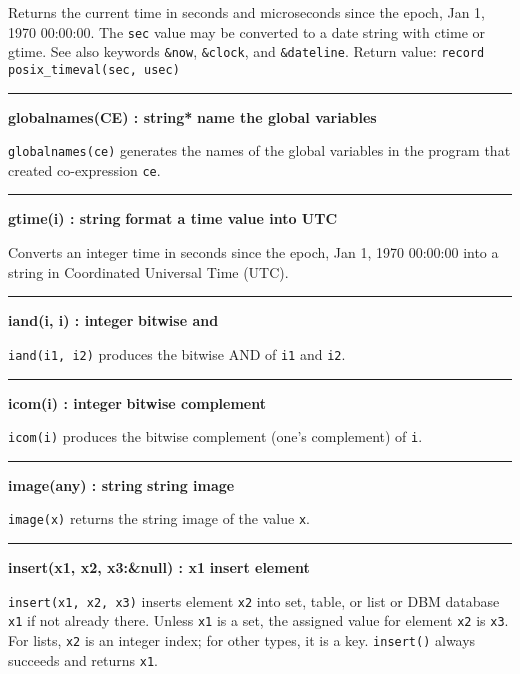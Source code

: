 \noindent
{}Returns the current time in seconds and microseconds
since the epoch, Jan 1, 1970 00:00:00. The \texttt{sec} value may be
converted to a date string with ctime or gtime. See also keywords
\texttt{\&now}, \texttt{\&clock}, and \texttt{\&dateline}. Return
value: \texttt{record posix\_timeval(sec, usec)} 

\bigskip\hrule\vspace{0.1cm}
\noindent
{\bf globalnames(CE) : string* } \hfill {\bf name the global variables}

\noindent
{}\texttt{globalnames(ce)} generates the names of the global
variables in the program that created co-expression \texttt{ce}.

\bigskip\hrule\vspace{0.1cm}
\noindent
{\bf gtime(i) : string } \hfill {\bf format a time value into UTC }

\noindent
Converts an integer time in seconds since the epoch, Jan 1, 1970
00:00:00 into a string in Coordinated Universal Time (UTC). 

\bigskip\hrule\vspace{0.1cm}
\noindent
{\bf iand(i, i) : integer } \hfill {\bf bitwise and}

\noindent
{}\texttt{iand(i1, i2)} produces the bitwise AND of
\texttt{i1} and \texttt{i2}.

\bigskip\hrule\vspace{0.1cm}
\noindent
{\bf icom(i) : integer } \hfill {\bf bitwise complement}

\noindent
\texttt{icom(i)} produces the bitwise complement (one's
complement) of \texttt{i}.

\bigskip\hrule\vspace{0.1cm}
\noindent
{\bf image(any) : string } \hfill {\bf string image}

\noindent
{}\texttt{image(x)} returns the string image of the value
\texttt{x}.

\bigskip\hrule\vspace{0.1cm}
\noindent
{\bf insert(x1, x2, x3:\&null) : x1 } \hfill {\bf insert element}\WarningNotThreadSafe

\noindent
\texttt{insert(x1, x2, x3)} inserts element \texttt{x2} into set, table,
or list or DBM database \texttt{x1} if not already there. Unless
\texttt{x1} is a set, the assigned value for element \texttt{x2} is
\texttt{x3}. For lists, \texttt{x2} is an integer index; for other
types, it is a key. \texttt{insert()} always succeeds
and returns \texttt{x1}.

